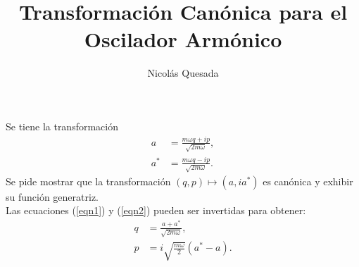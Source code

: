 \documentclass[spanish,12pt]{shreyasnotes}
\title{Transformaci\'on Can\'onica para el Oscilador Arm\'onico}
\author{Nicol\'as Quesada}
\date{}
\begin{document}
\maketitle

Se tiene la transformaci\'on 
\begin{subequations}
\begin{align}
a&=\frac{ m \omega q + i p }{
   \sqrt{ 2 m \omega }} ,
\label{eqn1}
\\
a^*&=\frac{ m \omega q - i p}{
   \sqrt{ 2m \omega }} .
\label{eqn2}
\end{align}
\end{subequations}
Se pide mostrar que la transformaci\'on $(q,p)\longmapsto(a,ia^{*})$ es can\'onica y exhibir su funci\'on generatriz.\\

Las ecuaciones (\ref{eqn1}) y (\ref{eqn2}) pueden ser invertidas para obtener:
\begin{subequations}
\begin{align}
q&=\frac{ a +a^* }{\sqrt{2 m \omega}},\\
p&=i  \sqrt{\frac{m \omega}{2}} \left(a^* -a \right).
\end{align}
\end{subequations}
\end{document}
